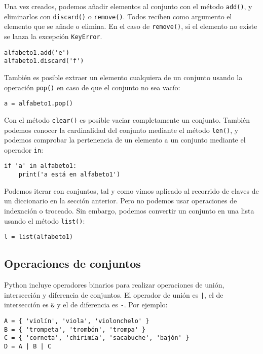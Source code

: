 Una vez creados, podemos añadir elementos al conjunto con el método \texttt{add()}, y eliminarlos con \texttt{discard()} o \texttt{remove()}. Todos reciben como argumento el elemento que se añade o elimina. En el caso de \texttt{remove()}, si el elemento no existe se lanza la excepción \texttt{KeyError}.

\begin{lstlisting}
alfabeto1.add('e')
alfabeto1.discard('f') 
\end{lstlisting}

También es posible extraer un elemento cualquiera de un conjunto usando la operación \texttt{pop()} en caso de que el conjunto no sea vacío:
\begin{lstlisting}
a = alfabeto1.pop()
\end{lstlisting}

Con el método \texttt{clear()} es posible vaciar completamente un conjunto. También podemos conocer la cardinalidad del conjunto mediante el método \texttt{len()}, y podemos comprobar la pertenencia de un elemento a un conjunto mediante el operador \texttt{in}:

\begin{lstlisting}
if 'a' in alfabeto1:
	print('a está en alfabeto1')
\end{lstlisting}

Podemos iterar con conjuntos, tal y como vimos aplicado al recorrido de claves de un diccionario en la sección anterior. Pero no podemos usar operaciones de indexación o troceado. Sin embargo, podemos convertir un conjunto en una lista usando el método \texttt{list()}:

\begin{lstlisting}
l = list(alfabeto1)
\end{lstlisting}


\subsection{Operaciones de conjuntos}

Python incluye operadores binarios para realizar operaciones de unión, intersección y diferencia de conjuntos. El operador de unión es \texttt{|}, el de intersección es \texttt{\&} y el de diferencia es \texttt{-}. Por ejemplo:

\begin{lstlisting}
A = { 'violín', 'viola', 'violonchelo' }
B = { 'trompeta', 'trombón', 'trompa' }
C = { 'corneta', 'chirimía', 'sacabuche', 'bajón' }
D = A | B | C
\end{lstlisting}

